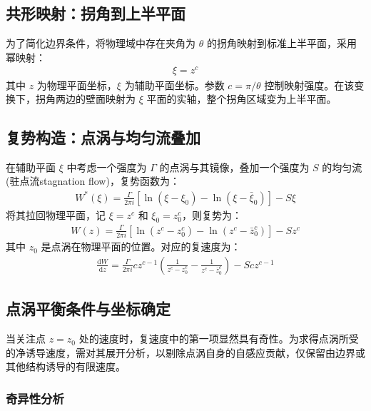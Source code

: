 \subsection{共形映射：拐角到上半平面}

为了简化边界条件，将物理域中存在夹角为 $\theta$ 的拐角映射到标准上半平面，采用幂映射：
\begin{align}
    \xi = z^c
\end{align}
其中 $z$ 为物理平面坐标，$\xi$ 为辅助平面坐标。参数 $c = \pi/\theta$ 控制映射强度。在该变换下，拐角两边的壁面映射为 $\xi$ 平面的实轴，整个拐角区域变为上半平面。

\subsection{复势构造：点涡与均匀流叠加}

在辅助平面 $\xi$ 中考虑一个强度为 $\Gamma$ 的点涡与其镜像，叠加一个强度为 $S$ 的均匀流(驻点流stagnation flow)，复势函数为：
\begin{align}
    W^*(\xi) = \frac{\Gamma}{2\pi i} \left[ \ln(\xi - \xi_0) - \ln(\xi - \bar{\xi}_0) \right] - S \xi
\end{align}
将其拉回物理平面，记 $\xi = z^c$ 和 $\xi_0 = z_0^c$，则复势为：
\begin{align}
    W(z) = \frac{\Gamma}{2\pi i} \left[ \ln(z^c - z_0^c) - \ln(z^c - \bar{z}_0^c) \right] - S z^c
\end{align}
其中 $z_0$ 是点涡在物理平面的位置。对应的复速度为：
\begin{align}
    \frac{\mathrm{d}W}{\mathrm{d}z}=\frac{\Gamma}{2\pi i}cz^{c-1}\left(\frac{1}{z^{c}-z_{0}^{c}}-\frac{1}{z^{c}-\bar{z}_{0}^{c}}\right)-Scz^{c-1}
\end{align}

\subsection{点涡平衡条件与坐标确定}

当关注点 $z = z_0$ 处的速度时，复速度中的第一项显然具有奇性。为求得点涡所受的净诱导速度，需对其展开分析，以剔除点涡自身的自感应贡献，仅保留由边界或其他结构诱导的有限速度。

\subsubsection{奇异性分析}


